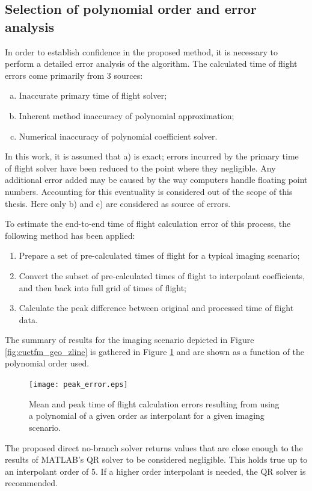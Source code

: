\subsection{Selection of polynomial order and error analysis}
In order to establish confidence in the proposed method, it is necessary to perform a detailed error analysis of the algorithm. The calculated time of flight errors come primarily from 3 sources:
\begin{enumerate}[a)]
\item Inaccurate primary time of flight solver;
\item Inherent method inaccuracy of polynomial approximation;
\item Numerical inaccuracy of polynomial coefficient solver. 
\end{enumerate}
In this work, it is assumed that a) is exact; errors incurred by the primary time of flight solver have been reduced to the point where they negligible. Any additional error added may be caused by the way computers handle floating point numbers. Accounting for this eventuality is considered out of the scope of this thesis. Here only b) and c) are considered as source of errors.

To estimate the end-to-end time of flight calculation error of this process, the following method has been applied:
\begin{enumerate}[1)]
\item Prepare a set of pre-calculated times of flight for a typical imaging scenario; 
\item Convert the subset of pre-calculated times of flight to interpolant coefficients, and then back into full grid of times of flight; 
\item Calculate the peak difference between original and processed time of flight data. 
\end{enumerate}

The summary of results for the imaging scenario depicted in Figure \ref{fig:cuetfm_geo_zline} is gathered in Figure \ref{fig:cuetfm_peak_error} and are shown as a function of the polynomial order used.  

\begin{figure}[htb]
\centering
		\texttt{[image: peak\_error.eps]}
		\caption{Mean and peak time of flight calculation errors resulting from using a polynomial of a given order as interpolant for a given imaging scenario.}
		\label{fig:cuetfm_peak_error}
\end{figure}


The proposed direct no-branch solver returns values that are close enough to the results of MATLAB's QR solver to be considered negligible. This holds true up to an interpolant order of 5. If a higher order interpolant is needed, the QR solver is recommended.

